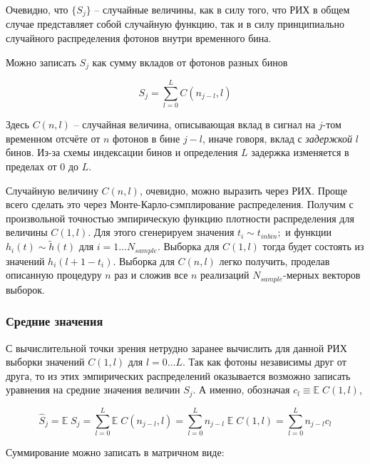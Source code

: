 \documentclass[12pt]{article}
\begin{document}
	Очевидно, что $\{ S_j \}$ -- случайные величины, как в силу того, что РИХ в общем случае представляет собой случайную функцию, так и в силу принципиально случайного распределения фотонов внутри временного бина.
	
	Можно записать $S_j$ как сумму вкладов от фотонов разных бинов
	
	\begin{equation}
		S_j = \sum_{l=0}^{L} C(n_{j-l}, l)
	\end{equation}

	Здесь $C(n, l)$ -- случайная величина, описывающая вклад в сигнал на $j$-том временном отсчёте от $n$ фотонов в бине $j - l$, иначе говоря, вклад с \textit{задержкой} $l$ бинов. Из-за схемы индексации бинов и определения $L$ задержка изменяется в пределах от $0$ до $L$.
	
	Случайную величину $C(n, l)$, очевидно, можно выразить через РИХ. Проще всего сделать это через Монте-Карло-сэмплирование распределения. Получим с произвольной точностью эмпирическую функцию плотности распределения для величины $C(1, l)$. Для этого сгенерируем значения $t_i \sim t_{inbin};$ и функции $h_i(t) \sim \tilde{h}(t)$ для $i = 1 \ldots N_{sample}$. Выборка для $C(1, l)$ тогда будет состоять из значений $h_i(l + 1 - t_i)$. Выборка для $C(n, l)$ легко получить, проделав описанную процедуру $n$ раз и сложив все $n$ реализаций $N_{sample}$-мерных векторов выборок.
	
	\subsubsection{Средние значения}
	
	С вычислительной точки зрения нетрудно заранее вычислить для данной РИХ выборки значений $C(1, l)$ для $l = 0 \ldots L$. Так как фотоны независимы друг от друга, то из этих эмпирических распределений оказывается возможно записать уравнения на средние значения величин $S_j$. А именно, обозначая $c_l \equiv \mathbb{E} \; C(1, l)$,
	
	\begin{equation}
		\hat{S}_j = \mathbb{E} \; S_j = \sum_{l=0}^{L} \mathbb{E} \; C(n_{j-l}, l) = \sum_{l=0}^{L} n_{j-l} \; \mathbb{E} \; C(1, l) = \sum_{l=0}^{L} n_{j-l} c_l
	\end{equation}

	Суммирование можно записать в матричном виде:
	
\end{document}
